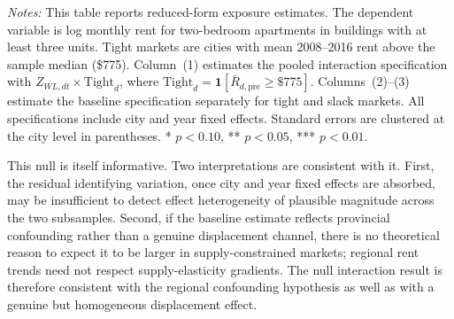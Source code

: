 \documentclass[12pt]{article}
\begin{document}
\begin{table}[!htbp]
  \centering
  \caption{Supply-Side Heterogeneity: Tight vs.\ Slack Markets}
  \label{tab:supply_het}
  \footnotesize


  \par\smallskip
  \begin{minipage}{0.96\textwidth}
  \footnotesize
  \textit{Notes:} This table reports reduced-form exposure estimates. The dependent
  variable is log monthly rent for two-bedroom apartments in buildings with at
  least three units. Tight markets are cities with mean 2008--2016 rent above
  the sample median (\$775). Column~(1) estimates the pooled interaction
  specification with $Z_{WL,dt}\times\mathrm{Tight}_d$, where
  $\mathrm{Tight}_d=\mathbf{1}[\bar{R}_{d,\mathrm{pre}}\geq\$775]$.
  Columns~(2)--(3) estimate the baseline specification separately for tight
  and slack markets. All specifications include city and year fixed effects.
  Standard errors are clustered at the city level in parentheses.
  * $p<0.10$, ** $p<0.05$, *** $p<0.01$.
  \end{minipage}
\end{table}

This null is itself informative. Two interpretations are consistent with it.
First, the residual identifying variation, once city and year fixed effects
are absorbed, may be insufficient to detect effect heterogeneity of
plausible magnitude across the two subsamples. Second, if the baseline estimate
reflects provincial confounding rather than a genuine displacement channel,
there is no theoretical reason to expect it to be larger in supply-constrained
markets; regional rent trends need not respect supply-elasticity gradients.
The null interaction result is therefore consistent with the regional
confounding hypothesis as well as with a genuine but homogeneous displacement
effect.
\end{document}
